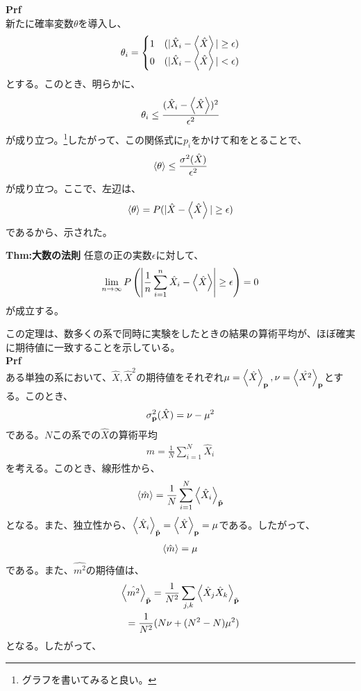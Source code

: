 \documentclass[a4paper,11pt]{jsarticle}
\numberwithin{equation}{section}
\begin{document}
\textbf{Prf}\\
新たに確率変数$\theta$を導入し、
\begin{align}
  \theta_i = \begin{cases}
    1 & (|\hat{X}_i - \expval{\hat{X}}| \geq \epsilon)\\
    0 & (|\hat{X}_i - \expval{\hat{X}}| < \epsilon)
  \end{cases}
\end{align}
とする。このとき、明らかに、
\begin{align}
  \theta_i \leq \frac{(\hat{X}_i - \expval{\hat{X}})^2}{\epsilon^2}
\end{align}
が成り立つ。\footnote{グラフを書いてみると良い。}したがって、この関係式に$p_i$をかけて和をとることで、
\begin{align}
  \ev{\theta} \leq \frac{\sigma^2(\hat{X})}{\epsilon^2}
\end{align}
が成り立つ。ここで、左辺は、
\begin{align}
  \ev{\theta} = P(|\hat{X} - \expval{\hat{X}}| \geq \epsilon)
\end{align}
であるから、示された。\hfill\qedsymbol\\

\begin{itembox}[l]{\textbf{Thm:大数の法則}}
  任意の正の実数$\epsilon$に対して、
  \begin{align}
    \lim_{n \to \infty} P\left(\left|\frac{1}{n} \sum_{i=1}^{n} \hat{X}_i - \expval{\hat{X}}\right| \geq \epsilon\right) = 0
  \end{align}
  が成立する。

\end{itembox}
この定理は、数多くの系で同時に実験をしたときの結果の算術平均が、ほぼ確実に期待値に一致することを示している。\\

\textbf{Prf}\\
ある単独の系において、$\hat{X},\hat{X}^2$の期待値をそれぞれ$\mu=\ev{\hat{X}}_{\vb{p}},\nu=\ev{\hat{X^2}}_{\vb{p}}$とする。このとき、
\begin{align}
  \sigma^2_{\vb{p}}(\hat{X}) = \nu - \mu^2
\end{align}
である。$N$この系での$\hat{X}$の算術平均
\begin{align}
  \hat{m} = \frac{1}{N} \sum_{i=1}^{N} \hat{X}_i
\end{align}
を考える。このとき、線形性から、
\begin{align}
  \expval{\hat{m}} = \frac{1}{N} \sum_{i=1}^{N} \expval{\hat{X}_i}_{\tilde{\vb{p}}} 
\end{align}
となる。また、独立性から、$\ev{\hat{X}_i}_{\tilde{\vb{p}}} = \ev{\hat{X}}_{\vb{p}}=\mu$である。したがって、
\begin{align}
  \expval{\hat{m}} = \mu
\end{align}
である。また、$\hat{m^2}$の期待値は、
\begin{align}
  \expval{\hat{m^2}}_{\tilde{\vb{p}}} = \frac{1}{N^2} \sum_{j,k} \expval{\hat{X}_j \hat{X}_k}_{\tilde{\vb{p}}}\\
  = \frac{1}{N^2} (N\nu + (N^2-N)\mu^2)
\end{align}
となる。したがって、
\end{document}

